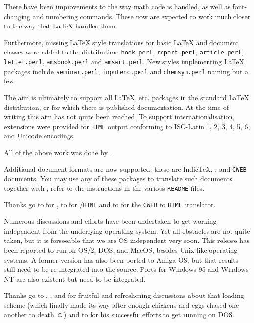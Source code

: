 \smallskip\noindent
There have been improvements to the way math code is handled, as well
as font-changing and numbering commands. These now are expected to
work much closer to the way that \LaTeX{} handles them.

\smallskip\noindent
Furthermore, missing \LaTeX{} style translations for basic \LaTeX{} 
and \AmSTeX{} document classes were added to the distribution: 
\texttt{book.perl}, \texttt{report.perl}, \texttt{article.perl},
\texttt{letter.perl}, \texttt{amsbook.perl} and \texttt{amsart.perl}.
New styles implementing \LaTeX{} packages include \texttt{seminar.perl},
\texttt{inputenc.perl} and \texttt{chemsym.perl} naming but a few.

The aim is ultimately to support all \LaTeX{}, \AmSTeX{} etc. packages in the 
standard \LaTeX{} distribution, or for which there is published documentation. 
At the time of writing this aim has not quite been reached.
To support internationalisation, \Perl{} extensions were provided for
\texttt{HTML} output conforming to ISO-Latin 1, 2, 3, 4, 5, 6,
and Unicode encodings.

\smallskip\noindent
All of the above work was done by \RossMoore.
\bigskip

Additional document formats are now supported, these are Indic\TeX{},
\FoilTeX{}, and \texttt{CWEB} documents.
You may use any of these packages to translate such documents together
with \latextohtml{}, refer to the instructions in the various
\texttt{README} files.

\smallskip\noindent
Thanks go to \RossMoore{} for \IndicHTML{}, to \Veytsman{} for 
\FoilTeX{}/\texttt{HTML} and to \Lippmann{} for the \texttt{CWEB} to
\texttt{HTML} translator.

\bigskip
Numerous discussions and efforts have been undertaken to get
\latextohtml{} working independent from the underlying operating
system.
Yet all obstacles are not quite taken, but it is forseeable that we are
OS independent very soon.
This release has been reported to run on OS/2, DOS, and MacOS, besides
Unix-like operating systems.
A former version has also been ported to Amiga OS, but that results
still need to be re-integrated into the source.
Ports for Windows 95 and Windows NT are also existent but need to be
integrated.

\smallskip\noindent
Thanks go to \Hennecke, \AxelRamge, \Rouchal{} and \Wortmann{} for
fruitful and refreshening discussions about that 
loading scheme (which finally made its way after enough chickens and
eggs chased one another to death $\smiley$) %
and to \Taupin{} for his successful efforts to get \latextohtml{}
running on DOS.

